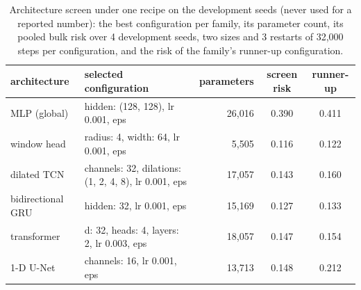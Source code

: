 \begin{table}[t]\centering\small
\caption{Architecture screen under one recipe on the development seeds (never used for a reported number): the best configuration per family, its parameter count, its pooled bulk risk over 4 development seeds, two sizes and 3 restarts of 32,000 steps per configuration, and the risk of the family's runner-up configuration.}
\label{tab:screen}
\begin{tabular}{llrcc}
\toprule
architecture & selected configuration & parameters & screen risk & runner-up \\
\midrule
MLP (global) & hidden: (128, 128), lr 0.001, eps & 26,016 & 0.390 & 0.411 \\
window head & radius: 4, width: 64, lr 0.001, eps & 5,505 & 0.116 & 0.122 \\
dilated TCN & channels: 32, dilations: (1, 2, 4, 8), lr 0.001, eps & 17,057 & 0.143 & 0.160 \\
bidirectional GRU & hidden: 32, lr 0.001, eps & 15,169 & 0.127 & 0.133 \\
transformer & d: 32, heads: 4, layers: 2, lr 0.003, eps & 18,057 & 0.147 & 0.154 \\
1-D U-Net & channels: 16, lr 0.001, eps & 13,713 & 0.148 & 0.212 \\
\bottomrule
\end{tabular}
\end{table}
